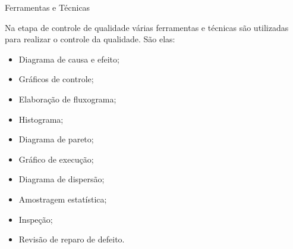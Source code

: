 \documentclass[xcolor=x11names,compress]{beamer}
\begin{document}
\begin{frame}[allowframebreaks]{Ferramentas e Técnicas}

Na etapa de controle de qualidade várias ferramentas e técnicas são utilizadas para realizar o controle da qualidade. São elas:

\begin{itemize}
\itemsep 5mm

\item Diagrama de causa e efeito;

\item Gráficos de controle;

\item Elaboração de fluxograma;

\item Histograma;

\item Diagrama de pareto;

\item Gráfico de execução;

\item Diagrama de dispersão;

\item Amostragem estatística;

\item Inspeção;

\item Revisão de reparo de defeito.

\end{itemize}

\end{frame}
\end{document}
